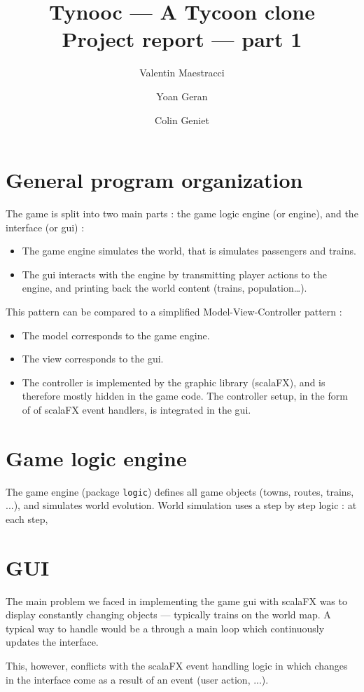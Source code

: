 \documentclass{article}
\begin{document}
\title{Tynooc --- A Tycoon clone \\ \large{Project report --- part 1}}
\author{Valentin Maestracci \and Yoan Geran \and Colin Geniet}
\maketitle

\tableofcontents

\section{General program organization}
The game is split into two main parts : the game logic engine (or engine), and the interface (or gui) :
\begin{itemize}
\item The game engine simulates the world, that is simulates passengers and trains.
\item The gui interacts with the engine by transmitting player actions to the engine, 
and printing back the world content (trains, population\dots).
\end{itemize}

This pattern can be compared to a simplified Model-View-Controller pattern :
\begin{itemize}[noitemsep]
\item The model corresponds to the game engine.
\item The view corresponds to the gui.
\item The controller is implemented by the graphic library (scalaFX), and is therefore mostly hidden in the game code.
The controller setup, in the form of of scalaFX event handlers, is integrated in the gui.
\end{itemize}



\section{Game logic engine}
The game engine (package \verb|logic|) defines all game objects (towns, routes, trains, ...), and simulates world evolution.
World simulation uses a step by step logic : at each step, 


\section{GUI}
The main problem we faced in implementing the game gui with scalaFX was to display constantly changing objects ---
typically trains on the world map. A typical way to handle would be a through a main loop which continuously updates
the interface.

This, however, conflicts with the scalaFX event handling logic in which changes in the interface come as a result of an event
(user action, ...).
\end{document}
